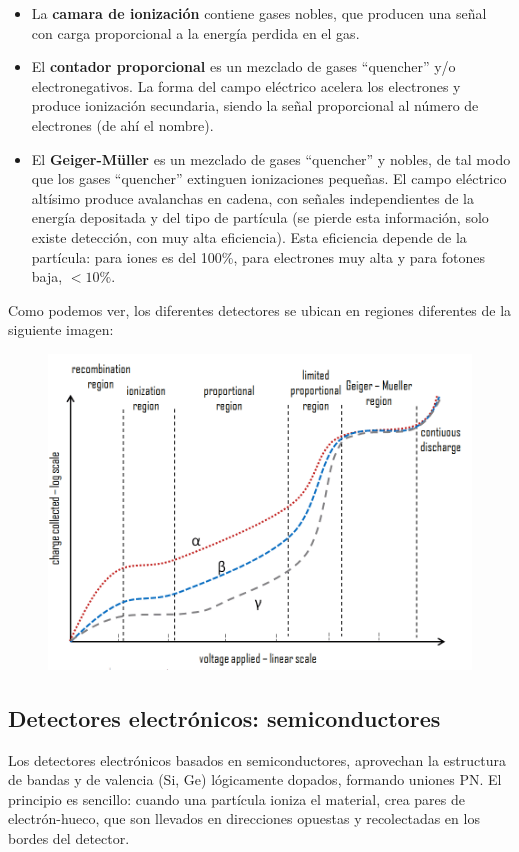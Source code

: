 \begin{itemize}
    \item La \textbf{camara de ionización} contiene gases nobles, que producen una señal con carga proporcional a la energía perdida en el gas. 
    \item El \textbf{contador proporcional} es un mezclado de gases ``quencher'' y/o electronegativos. La forma del campo eléctrico acelera los electrones y produce ionización secundaria, siendo la señal proporcional al número de electrones (de ahí el nombre). 
    \item El \textbf{Geiger-Müller} es un mezclado de gases ``quencher'' y nobles, de tal modo que los gases ``quencher'' extinguen ionizaciones pequeñas. El campo eléctrico altísimo produce avalanchas en cadena, con señales independientes de la energía depositada y del tipo de partícula (se pierde esta información, solo existe detección, con muy alta eficiencia). Esta eficiencia depende de la partícula: para iones es del 100\%, para electrones muy alta y para fotones baja, $<10\%$. 
\end{itemize}
Como podemos ver, los diferentes detectores se ubican en regiones  diferentes de la siguiente imagen: 

\begin{figure}[H] \centering
    \includegraphics[width=0.7\linewidth]{Cuerpo/Ch_01/Detectores_03.png}
\end{figure}


\subsection{Detectores electrónicos: semiconductores}

Los detectores electrónicos basados en semiconductores, aprovechan la estructura de bandas y de valencia (Si, Ge) lógicamente dopados, formando uniones PN. El principio es sencillo: cuando una partícula ioniza el material, crea pares de electrón-hueco, que son llevados en direcciones opuestas y recolectadas en los bordes del detector. 

